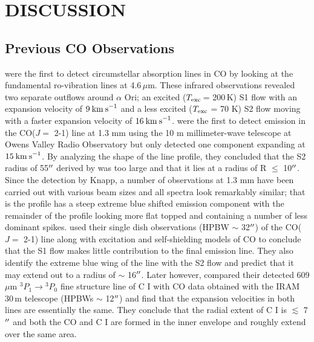 \documentclass[iop]{emulateapj}
\begin{document}
\section{DISCUSSION}
\subsection{Previous CO Observations}
\cite{1979ApJ...233L.135B} were the first to detect circumstellar absorption lines in CO by looking at the fundamental ro-vibration lines at 4.6$\,\mu$m. These infrared observations revealed two separate outflows around $\alpha$ Ori; an excited (\rm{$T_{\rm{exc}}$}\,= 200\,K) S1 flow with an expansion velocity of $9\>{\rm km\>s}^{-1}$ and a less excited (\rm{$T_{\rm{exc}}$} = 70 K) S2 flow moving with a faster expansion velocity of $16\>{\rm km\>s}^{-1}$. \cite{1980ApJ...242L..25K} were the first to detect emission in the CO($J=$ 2-1) line at 1.3 mm using the 10 m millimeter-wave telescope at Owens Valley Radio Observatory but only detected one component expanding at $15\>{\rm km\>s}^{-1}$. By analyzing the shape of the line profile, they concluded that the S2 radius of 55$\mbox{$^{\prime\prime}$}$ derived by \cite{1979ApJ...233L.135B} was too large and that it lies at a radius of R $\leq$ 10$\mbox{$^{\prime\prime}$}$. Since the detection by Knapp, a number of observations at 1.3 mm have been carried out with various beam sizes and all spectra look remarkably similar; that is the profile has a steep extreme blue shifted emission component with the remainder of the profile looking more flat topped and containing a number of less dominant spikes. \cite{1987ApJ...313..400H} used their single dish observations (HPBW $\sim$ 32$\mbox{$^{\prime\prime}$}$) of the CO($J=$ 2-1) line along with excitation and self-shielding models of CO to conclude that the S1 flow makes little contribution to the final emission line. They also identify the extreme blue wing of the line with the S2 flow and predict that it may extend out to a radius of $\sim$ 16$\mbox{$^{\prime\prime}$}$. Later however, \cite{1994ApJ...424L.127H} compared their detected 609 $\mu$m ${}^3P{}_1\rightarrow{}^3P{}_0$ fine structure line of C I with CO data obtained with the IRAM 30\,m telescope (HPBWs $\sim$ 12$\mbox{$^{\prime\prime}$}$) and find that the expansion velocities in both lines are essentially the same. They conclude that the radial extent of C I is $\lesssim$ 7$\mbox{$^{\prime\prime}$}$ and both the CO and C I are formed in the inner envelope and roughly extend over the same area.  
\end{document}
